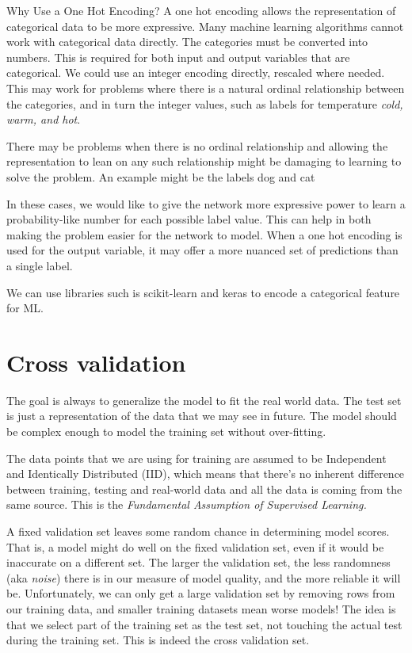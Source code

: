 \documentclass[12pt]{report}
\begin{document}
Why Use a One Hot Encoding?
A one hot encoding allows the representation of categorical data to be more expressive. Many machine learning algorithms cannot work with categorical data directly. The categories must be converted into numbers. This is required for both input and output variables that are categorical. We could use an integer encoding directly, rescaled where needed. This may work for problems where there is a natural ordinal relationship between the categories, and in turn the integer values, such as labels for temperature \textit{cold, warm, and hot}.

There may be problems when there is no ordinal relationship and allowing the representation to lean on any such relationship might be damaging to learning to solve the problem. An example might be the labels dog and cat

In these cases, we would like to give the network more expressive power to learn a probability-like number for each possible label value. This can help in both making the problem easier for the network to model. When a one hot encoding is used for the output variable, it may offer a more nuanced set of predictions than a single label.

We can use libraries such is scikit-learn and keras to encode a categorical feature for ML.

\section{Cross validation}

The goal is always to generalize the model to fit the real world data. The test set is just a representation of the data that we may see in future. The model should be complex enough to model the training set without over-fitting.

The data points that we are using for training are assumed to be Independent and Identically Distributed (IID), which means that there’s no inherent difference between training, testing and real-world data and all the data is coming from the same source. This is the \textit{Fundamental Assumption of Supervised Learning.}


A fixed validation set leaves some random chance in determining model scores. That is, a model might do well on the fixed validation set, even if it would be inaccurate on a different set. The larger the validation set, the less randomness (aka \textit{noise}) there is in our measure of model quality, and the more reliable it will be. Unfortunately, we can only get a large validation set by removing rows from our training data, and smaller training datasets mean worse models! The idea is that we select part of the training set as the test set, not touching the actual test during the training set. This is indeed the cross validation set.
\end{document}
